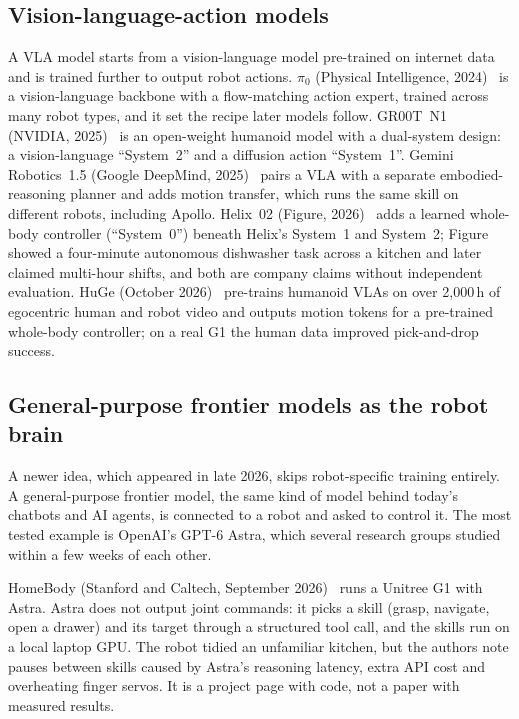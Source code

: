 \documentclass[11pt,a4paper]{article}
\begin{document}
\subsection{Vision-language-action models}\label{sec:vla}

A VLA model starts from a vision-language model pre-trained on internet data
and is trained further to output robot actions.  $\pi_0$ (Physical
Intelligence, 2024)~\cite{pi0} is a vision-language backbone with a
flow-matching action expert, trained across many robot types, and it set the
recipe later models follow.  GR00T~N1 (NVIDIA, 2025)~\cite{groot-n1} is an
open-weight humanoid model with a dual-system design: a vision-language
``System~2'' and a diffusion action ``System~1''.  Gemini Robotics~1.5 (Google
DeepMind, 2025)~\cite{gemini-15} pairs a VLA with a separate embodied-reasoning
planner and adds motion transfer, which runs the same skill on different
robots, including Apollo.  Helix~02 (Figure, 2026)~\cite{helix-02} adds a
learned whole-body controller (``System~0'') beneath Helix's System~1 and
System~2; Figure showed a four-minute autonomous dishwasher task across a
kitchen and later claimed multi-hour shifts, and both are company claims
without independent evaluation.  HuGe (October 2026)~\cite{huge-2026}
pre-trains humanoid VLAs on over 2{,}000\,h of egocentric human and robot video
and outputs motion tokens for a pre-trained whole-body controller; on a real G1
the human data improved pick-and-drop success.

\subsection{General-purpose frontier models as the robot brain}\label{sec:astra}

A newer idea, which appeared in late 2026, skips robot-specific training
entirely.  A general-purpose frontier model, the same kind of model behind
today's chatbots and AI agents, is connected to a robot and asked to control
it.  The most tested example is OpenAI's GPT-6 Astra, which several research
groups studied within a few weeks of each other.

HomeBody (Stanford and Caltech, September 2026)~\cite{homebody-2026} runs a
Unitree G1 with Astra.  Astra does not output joint commands: it picks a skill
(grasp, navigate, open a drawer) and its target through a structured tool call,
and the skills run on a local laptop GPU.  The robot tidied an unfamiliar
kitchen, but the authors note pauses between skills caused by Astra's reasoning
latency, extra API cost and overheating finger servos.  It is a project page
with code, not a paper with measured results.
\end{document}
